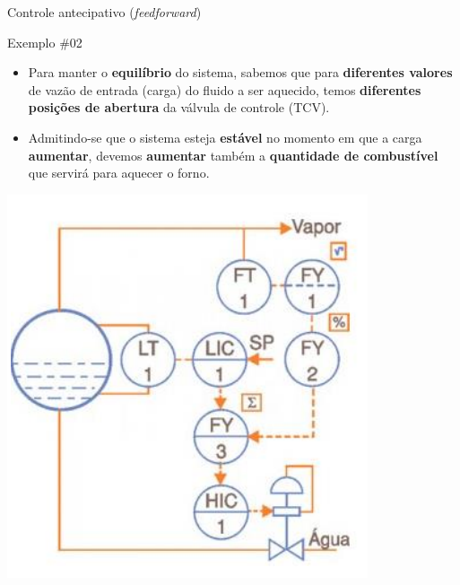\begin{frame}{Controle antecipativo (\textit{feedforward})}
	\begin{block}{Exemplo \#02}
		\begin{itemize}
			\item Para manter o \textbf{equilíbrio} do sistema, sabemos que para \textbf{diferentes valores} de vazão de entrada (carga) do fluido a ser aquecido, temos \textbf{diferentes posições de abertura} da válvula de controle (TCV).
			\item Admitindo-se que o sistema esteja \textbf{estável} no momento em que a carga \textbf{aumentar}, devemos \textbf{aumentar} também a \textbf{quantidade de combustível} que servirá para aquecer o forno.
		\end{itemize}
	\end{block}

	\centering
	\includegraphics[height=0.5\textheight]{Figuras/Ch15/fig2}
\end{frame}


